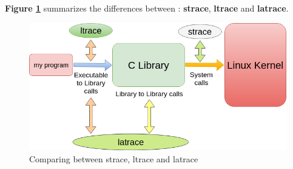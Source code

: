 \textbf{Figure \ref{Comparing between strace, ltrace and latrace}} summarizes the differences between : \textbf{strace}, \textbf{ltrace} and \textbf{latrace}. 
\begin{figure}[H]
		\centering
        \includegraphics[scale=0.40]{img/solution/strace-ltrace-latrace.png}
        \caption{Comparing between strace, ltrace and latrace}
        \label{Comparing between strace, ltrace and latrace}
    \end{figure}


